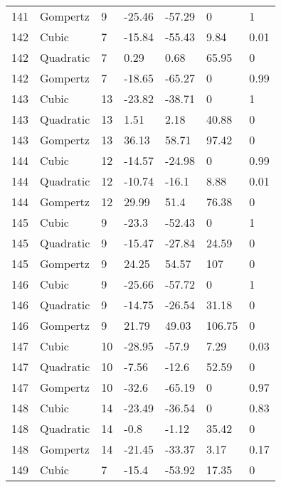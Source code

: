 \documentclass[11pt]{article}
\begin{document}
\begin{center}
\begin{longtable}{lllllll}
    141 & Gompertz  & 9               & -25.46  & -57.29  & 0       & 1    \\
    142 & Cubic     & 7               & -15.84  & -55.43  & 9.84    & 0.01 \\
    142 & Quadratic & 7               & 0.29    & 0.68    & 65.95   & 0    \\
    142 & Gompertz  & 7               & -18.65  & -65.27  & 0       & 0.99 \\
    143 & Cubic     & 13              & -23.82  & -38.71  & 0       & 1    \\
    143 & Quadratic & 13              & 1.51    & 2.18    & 40.88   & 0    \\
    143 & Gompertz  & 13              & 36.13   & 58.71   & 97.42   & 0    \\
    144 & Cubic     & 12              & -14.57  & -24.98  & 0       & 0.99 \\
    144 & Quadratic & 12              & -10.74  & -16.1   & 8.88    & 0.01 \\
    144 & Gompertz  & 12              & 29.99   & 51.4    & 76.38   & 0    \\
    145 & Cubic     & 9               & -23.3   & -52.43  & 0       & 1    \\
    145 & Quadratic & 9               & -15.47  & -27.84  & 24.59   & 0    \\
    145 & Gompertz  & 9               & 24.25   & 54.57   & 107     & 0    \\
    146 & Cubic     & 9               & -25.66  & -57.72  & 0       & 1    \\
    146 & Quadratic & 9               & -14.75  & -26.54  & 31.18   & 0    \\
    146 & Gompertz  & 9               & 21.79   & 49.03   & 106.75  & 0    \\
    147 & Cubic     & 10              & -28.95  & -57.9   & 7.29    & 0.03 \\
    147 & Quadratic & 10              & -7.56   & -12.6   & 52.59   & 0    \\
    147 & Gompertz  & 10              & -32.6   & -65.19  & 0       & 0.97 \\
    148 & Cubic     & 14              & -23.49  & -36.54  & 0       & 0.83 \\
    148 & Quadratic & 14              & -0.8    & -1.12   & 35.42   & 0    \\
    148 & Gompertz  & 14              & -21.45  & -33.37  & 3.17    & 0.17 \\
    149 & Cubic     & 7               & -15.4   & -53.92  & 17.35   & 0    \\

\end{longtable}
\end{center}
\end{document}

